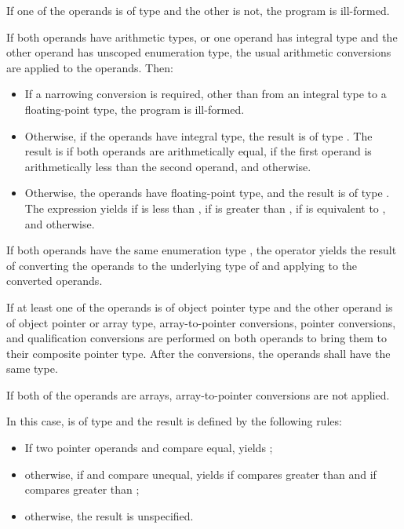 \pnum
If one of the operands is of type 
and the other is not, the program is ill-formed.

\pnum
If both operands have arithmetic types,
or one operand has integral type and
the other operand has unscoped enumeration type,
the usual arithmetic conversions are applied to the operands.
Then:

\begin{itemize}
\item
If a narrowing conversion is required,
other than from an integral type to a floating-point type,
the program is ill-formed.

\item
Otherwise, if the operands have integral type,
the result is of type .
The result is
if both operands are arithmetically equal,
if the first operand is arithmetically
less than the second operand,
and
otherwise.
\item
Otherwise, the operands have floating-point type, and
the result is of type .
The expression  yields
if  is less than ,
if  is greater than ,
if  is equivalent to ,
and
 otherwise.
\end{itemize}

\pnum
If both operands have the same enumeration type ,
the operator yields the result of
converting the operands to the underlying type of 
and applying \tcode{<=>} to the converted operands.

\pnum
If at least one of the operands is of object pointer type and
the other operand is of object pointer or array type,
array-to-pointer conversions,
pointer conversions,
and
qualification conversions
are performed on both operands
to bring them to their composite pointer type.
After the conversions, the operands shall have the same type.
\begin{note}
If both of the operands are arrays,
array-to-pointer conversions are not applied.
\end{note}
In this case,
 is of type  and
the result is defined by the following rules:
\begin{itemize}
\item
If two pointer operands  and  compare equal,
 yields ;
\item
otherwise, if  and  compare unequal,
 yields
if  compares greater than 
and
if  compares greater than ;
\item
otherwise, the result is unspecified.
\end{itemize}

